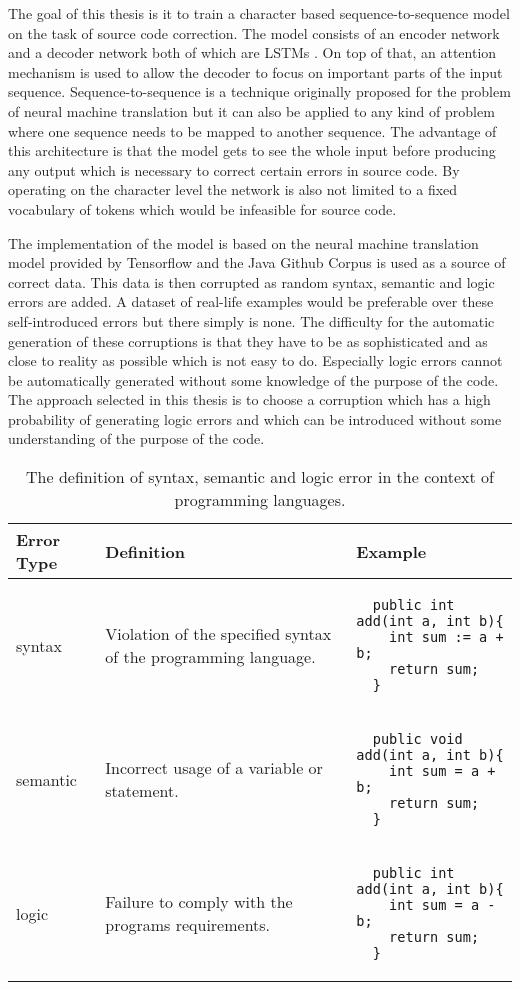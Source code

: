 The goal of this thesis is it to train a character based sequence-to-sequence model \cite{seq2seq} on the task of source code correction. The model consists of an encoder network and a decoder network both of which are LSTMs \cite{lstm}. On top of that, an attention mechanism \cite{attention_luong} is used to allow the decoder to focus on important parts of the input sequence. Sequence-to-sequence is a technique originally proposed for the problem of neural machine translation but it can also be applied to any kind of problem where one sequence needs to be mapped to another sequence. The advantage of this architecture is that the model gets to see the whole input before producing any output which is necessary to correct certain errors in source code. By operating on the character level the network is also not limited to a fixed vocabulary of tokens which would be infeasible for source code.

 The implementation of the model is based on the neural machine translation model provided by Tensorflow \cite{seq2seq_tutorial} and the Java Github Corpus \cite{java_dataset} is used as a source of correct data. This data is then corrupted as random syntax, semantic and logic errors are added. A dataset of real-life examples would be preferable over these self-introduced errors but there simply is none. The difficulty for the automatic generation of these corruptions is that they have to be as sophisticated and as close to reality as possible which is not easy to do. Especially logic errors cannot be automatically generated without some knowledge of the purpose of the code. The approach selected in this thesis is to choose a corruption which has a high probability of generating logic errors and which can be introduced without some understanding of the purpose of the code.

\begin{table}[t]
\begin{tabular}{ | m{2cm}  m{35mm}  m{55mm} | }
  \hline
  Error Type & Definition & Example \\
  \hline
  syntax &
  Violation of the specified syntax of the programming language. &
  \begin{lstlisting}
  public int add(int a, int b){
    int sum := a + b;
    return sum;
  }
  \end{lstlisting}
  \\
  semantic &
  Incorrect usage of a variable or statement. &
  \begin{lstlisting}
  public void add(int a, int b){
    int sum = a + b;
    return sum;
  }
  \end{lstlisting}
  \\
  logic &
  Failure to comply with the programs requirements. &
  \begin{lstlisting}
  public int add(int a, int b){
    int sum = a - b;
    return sum;
  }
  \end{lstlisting}
  \\
  \hline
\end{tabular}
\caption{The definition of syntax, semantic and logic error in the context of programming languages.}
\label{error_table}
\end{table}

